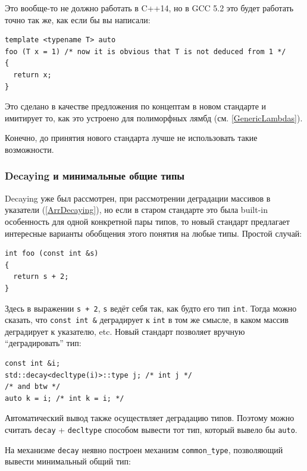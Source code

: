 \documentclass[a4paper,12pt,oneside]{article}
\newif\ifanswers
\begin{document}
\ifanswers
Правильный ответ: этот код не должен вводить вас в заблуждение: тип для \lstinline!x! выводится из типа в точке вызова, а не из аргумента по умолчанию
\fi

Это вообще-то не должно работать в C++14, но в GCC 5.2 это будет работать точно так же, как если бы вы написали:

\begin{lstlisting}
template <typename T> auto 
foo (T x = 1) /* now it is obvious that T is not deduced from 1 */
{
  return x;
}
\end{lstlisting}

Это сделано в качестве предложения по концептам в новом стандарте и имитирует то, как это устроено для полиморфных лямбд (см. \ref{GenericLambdas}).

Конечно, до принятия нового стандарта лучше не использовать такие возможности.

\subsubsection{Decaying и минимальные общие типы}\label{Decaying}

Decaying уже был рассмотрен, при рассмотрении деградации массивов в указатели (\ref{ArrDecaying}), но если в старом стандарте это была built-in особенность для одной конкретной пары типов, то новый стандарт предлагает интересные варианты обобщения этого понятия на любые типы. Простой случай:

\begin{lstlisting}
int foo (const int &s)
{
  return s + 2;
}
\end{lstlisting}

Здесь в выражении \lstinline!s + 2!, \lstinline!s! ведёт себя так, как будто его тип \lstinline!int!. Тогда можно сказать, что \lstinline!const int &! деградирует к \lstinline!int! в том же смысле, в каком массив деградирует к указателю, etc. Новый стандарт позволяет вручную ``деградировать'' тип:

\begin{lstlisting}
const int &i;
std::decay<decltype(i)>::type j; /* int j */
/* and btw */
auto k = i; /* int k = i; */
\end{lstlisting}

Автоматический вывод также осуществляет деградацию типов. Поэтому можно считать \lstinline!decay! + \lstinline!decltype! способом вывести тот тип, который вывело бы \lstinline!auto!.

На механизме \lstinline!decay! неявно построен механизм \lstinline!common_type!, позволяющий вывести минимальный общий тип:
\end{document}
